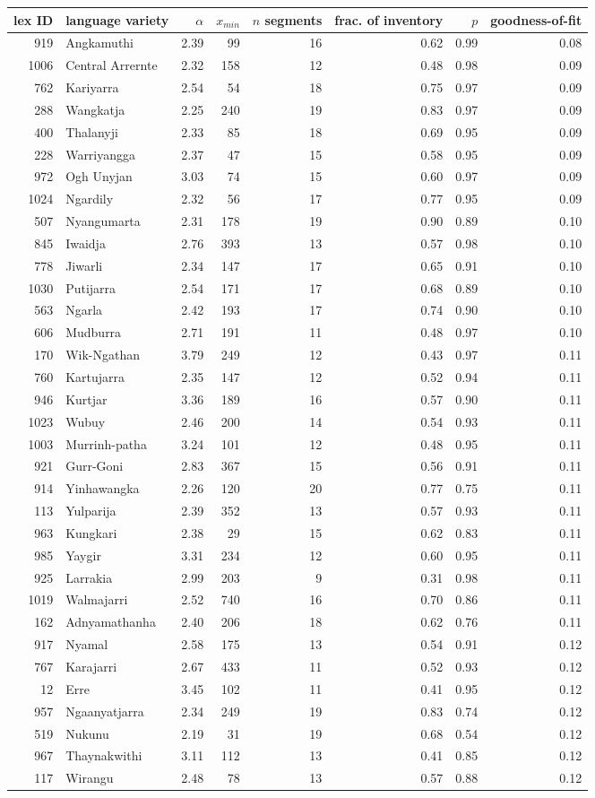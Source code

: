 \begin{longtable}[]{@{}rlrrrrrr@{}}
\toprule
\textbf{lex ID} & \textbf{language variety} & \(\alpha\) & \(x_{min}\) &
\(n\) \textbf{segments} & \textbf{frac. of inventory} & \(p\) &
\textbf{goodness-of-fit}\tabularnewline
\midrule
\endhead
919 & Angkamuthi & 2.39 & 99 & 16 & 0.62 & 0.99 & 0.08\tabularnewline
1006 & Central Arrernte & 2.32 & 158 & 12 & 0.48 & 0.98 &
0.09\tabularnewline
762 & Kariyarra & 2.54 & 54 & 18 & 0.75 & 0.97 & 0.09\tabularnewline
288 & Wangkatja & 2.25 & 240 & 19 & 0.83 & 0.97 & 0.09\tabularnewline
400 & Thalanyji & 2.33 & 85 & 18 & 0.69 & 0.95 & 0.09\tabularnewline
228 & Warriyangga & 2.37 & 47 & 15 & 0.58 & 0.95 & 0.09\tabularnewline
972 & Ogh Unyjan & 3.03 & 74 & 15 & 0.60 & 0.97 & 0.09\tabularnewline
1024 & Ngardily & 2.32 & 56 & 17 & 0.77 & 0.95 & 0.09\tabularnewline
507 & Nyangumarta & 2.31 & 178 & 19 & 0.90 & 0.89 & 0.10\tabularnewline
845 & Iwaidja & 2.76 & 393 & 13 & 0.57 & 0.98 & 0.10\tabularnewline
778 & Jiwarli & 2.34 & 147 & 17 & 0.65 & 0.91 & 0.10\tabularnewline
1030 & Putijarra & 2.54 & 171 & 17 & 0.68 & 0.89 & 0.10\tabularnewline
563 & Ngarla & 2.42 & 193 & 17 & 0.74 & 0.90 & 0.10\tabularnewline
606 & Mudburra & 2.71 & 191 & 11 & 0.48 & 0.97 & 0.10\tabularnewline
170 & Wik-Ngathan & 3.79 & 249 & 12 & 0.43 & 0.97 & 0.11\tabularnewline
760 & Kartujarra & 2.35 & 147 & 12 & 0.52 & 0.94 & 0.11\tabularnewline
946 & Kurtjar & 3.36 & 189 & 16 & 0.57 & 0.90 & 0.11\tabularnewline
1023 & Wubuy & 2.46 & 200 & 14 & 0.54 & 0.93 & 0.11\tabularnewline
1003 & Murrinh-patha & 3.24 & 101 & 12 & 0.48 & 0.95 &
0.11\tabularnewline
921 & Gurr-Goni & 2.83 & 367 & 15 & 0.56 & 0.91 & 0.11\tabularnewline
914 & Yinhawangka & 2.26 & 120 & 20 & 0.77 & 0.75 & 0.11\tabularnewline
113 & Yulparija & 2.39 & 352 & 13 & 0.57 & 0.93 & 0.11\tabularnewline
963 & Kungkari & 2.38 & 29 & 15 & 0.62 & 0.83 & 0.11\tabularnewline
985 & Yaygir & 3.31 & 234 & 12 & 0.60 & 0.95 & 0.11\tabularnewline
925 & Larrakia & 2.99 & 203 & 9 & 0.31 & 0.98 & 0.11\tabularnewline
1019 & Walmajarri & 2.52 & 740 & 16 & 0.70 & 0.86 & 0.11\tabularnewline
162 & Adnyamathanha & 2.40 & 206 & 18 & 0.62 & 0.76 &
0.11\tabularnewline
917 & Nyamal & 2.58 & 175 & 13 & 0.54 & 0.91 & 0.12\tabularnewline
767 & Karajarri & 2.67 & 433 & 11 & 0.52 & 0.93 & 0.12\tabularnewline
12 & Erre & 3.45 & 102 & 11 & 0.41 & 0.95 & 0.12\tabularnewline
957 & Ngaanyatjarra & 2.34 & 249 & 19 & 0.83 & 0.74 &
0.12\tabularnewline
519 & Nukunu & 2.19 & 31 & 19 & 0.68 & 0.54 & 0.12\tabularnewline
967 & Thaynakwithi & 3.11 & 112 & 13 & 0.41 & 0.85 & 0.12\tabularnewline
117 & Wirangu & 2.48 & 78 & 13 & 0.57 & 0.88 & 0.12\tabularnewline

\end{longtable}
